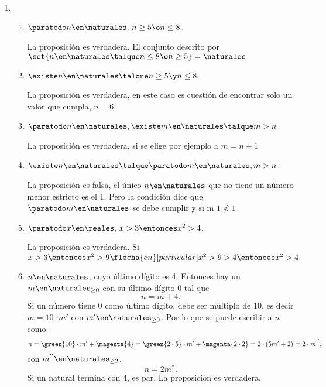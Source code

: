 \begin{enumerate}[label=\roman*)]
  \item

        \begin{enumerate}[label=\alph*)]
          \item $\paratodo n \en \naturales,\, n \geq 5 \o n \leq 8$.\par
                La proposición es verdadera. El conjunto descrito por $\set{ n \en \naturales \talque n \leq 8 \o n \geq 5} = \naturales$\par
                \doceiA                        \par

          \item $\existe n \en \naturales \talque n \geq 5 \y n\leq 8.$\par
                La proposición es verdadera, en este caso es cuestión de encontrar solo un valor que cumpla, $n = 6$

          \item $\paratodo n \en \naturales, \existe m \en \naturales \talque m > n$.\par
                La proposición es verdadera, si se elige por ejemplo a $m = n+1$

          \item $\existe n \en \naturales \talque \paratodo m \en \naturales, m >n$.\par
                La proposición es falsa, el único $n \en \naturales$ que no tiene un número menor estricto es el 1. Pero la condición
                dice que $\paratodo m \en \naturales$ se debe cumplir y si m $1 \nless 1$

          \item $\paratodo x \en \reales,\, x > 3 \entonces x^2 > 4$.\par
                La proposición es verdadera. Si $x > 3 \entonces x^2 > 9 \flecha{en}[particular] x^2 > 9 > 4 \entonces x^2 > 4$

          \item $n \en \naturales$, cuyo último dígito es 4. Entonces hay un $m \en \naturales_{\geq 0}$ con su último dígito 0 tal que
                $$
                  n = m + 4.
                $$
                Si un número tiene 0 como último dígito, debe ser múltiplo de 10, es decir
                $m = 10 \cdot m'$ con $m' \en \naturales_{\geq 0} $. Por lo que se puede escribir a $n$ como:
                $$
                  n = \green{10} \cdot m' + \magenta{4} =
                  \green{2 \cdot 5} \cdot m' + \magenta{2 \cdot 2} =
                  2 \cdot (5 m' + 2) =
                  2 \cdot m^{''},
                $$ con $m^{''} \en \naturales_{\geq 2}$.
                $$
                  n = 2m^{''}.
                $$
                Si un natural termina con 4, es par. La proposición es verdadera.


\end{enumerate}
\end{enumerate}
